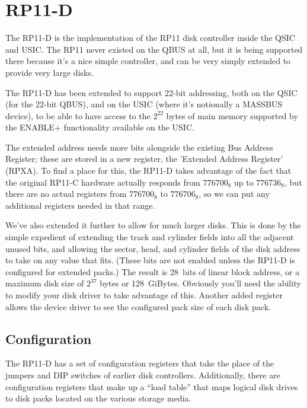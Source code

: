 %

\chapter{RP11-D}

The RP11-D is the implementation of the RP11 disk controller inside the QSIC
and USIC. The RP11 never existed on the QBUS at all, but it is being
supported there because it's a nice simple controller, and can be very simply
extended to provide very large disks.

The RP11-D has been extended to support 22-bit addressing, both on the QSIC
(for the 22-bit QBUS), and on the USIC (where it's notionally a MASSBUS
device), to be able to have access to the $2^{22}$ bytes of main memory
supported by the ENABLE+ functionality available on the USIC.

The extended address needs more bits alongside the existing Bus Address
Register; these are stored in a new register, the 'Extended Address Register'
(RPXA). To find a place for this, the RP11-D takes advantage of the fact that
the original RP11-C hardware actually responds from $776700_8$ up to
$776736_8$, but there are no actual registers from $776700_8$ to
$776706_8$, so we can put any additional registers needed in that range.

We've also extended it further to allow for much larger disks. This is done by the
simple expedient of extending the track and cylinder fields into all the adjacent
unused bits, and allowing the sector, head, and cylinder fields of the disk address
to take on any value that fits. (These bits are not enabled unless the RP11-D is
configured for extended packs.) The result is 28~bits of linear block address, or a
maximum disk size of $2^{37}$ bytes or 128~GiBytes.  Obviously you'll need the
ability to modify your disk driver to take advantage of this.  Another added register
allows the device driver to see the configured pack size of each disk pack.

\section{Configuration}

The RP11-D has a set of configuration registers that take the place of the jumpers
and DIP switches of earlier disk controllers.  Additionally, there are configuration
registers that make up a ``load table'' that maps logical disk drives to disk packs
located on the various storage media.

